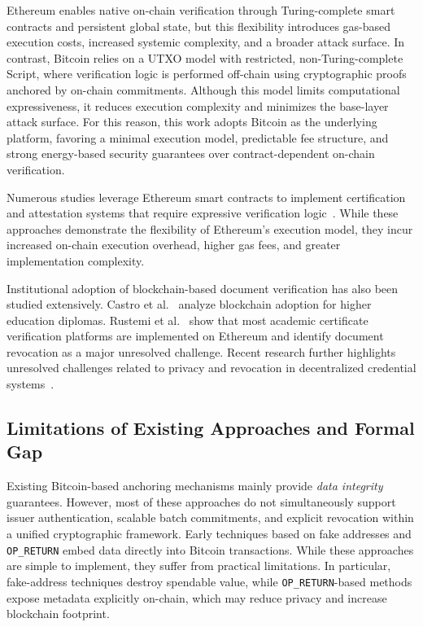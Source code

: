 \documentclass{IEEEoj}
\begin{document}


Ethereum enables native on-chain verification through Turing-complete smart contracts and persistent global state, but this flexibility introduces gas-based execution costs, increased systemic complexity, and a broader attack surface. In contrast, Bitcoin relies on a UTXO model with restricted, non-Turing-complete Script, where verification logic is performed off-chain using cryptographic proofs anchored by on-chain commitments. 
Although this model limits computational expressiveness, it reduces execution complexity and minimizes the base-layer attack surface. 
For this reason, this work adopts Bitcoin as the underlying platform, favoring a minimal execution model, predictable fee structure, and strong energy-based security guarantees over contract-dependent on-chain verification.

Numerous studies leverage Ethereum smart contracts to implement certification and attestation systems that require expressive verification logic~\cite{Wang2019BlockchainCT,Li2020DecentralizedPKI,Pennino2021EfficientCertification,Palmisano2022NotarizationAntiPlagiarism,Mishra2025BlockchainDecentralized,Harer2022DecentralizedAttestation}.
While these approaches demonstrate the flexibility of Ethereum’s execution model, they incur increased on-chain execution overhead, higher gas fees, and greater implementation complexity.

Institutional adoption of blockchain-based document verification has also been studied extensively. Castro et al.~\cite{Castro2021BlockchainHigherEducation} analyze blockchain adoption for higher education diplomas.
Rustemi et al.~\cite{Rustemi2023SLRBlockchainCertificates} show that most academic certificate verification platforms are implemented on Ethereum and identify document revocation as a major unresolved challenge.
Recent research further highlights unresolved challenges related to privacy and revocation in decentralized credential systems~\cite{Ramica2024SelectiveDisclosure,Zhang2025PrivacyProtectionIssuanceRevocationVerifiableCredentials}.

\subsection{Limitations of Existing Approaches and Formal Gap}
\label{sec:formal_gap}

Existing Bitcoin-based anchoring mechanisms mainly provide \emph{data integrity} guarantees. However, most of these approaches do not simultaneously support issuer authentication, scalable batch commitments, and explicit revocation within a unified cryptographic framework. Early techniques based on fake addresses and \texttt{OP\_RETURN} embed data directly into Bitcoin transactions. While these approaches are simple to implement, they suffer from practical limitations. In particular, fake-address techniques destroy spendable value, while \texttt{OP\_RETURN}-based methods expose metadata explicitly on-chain, which may reduce privacy and increase blockchain footprint.
\end{document}
